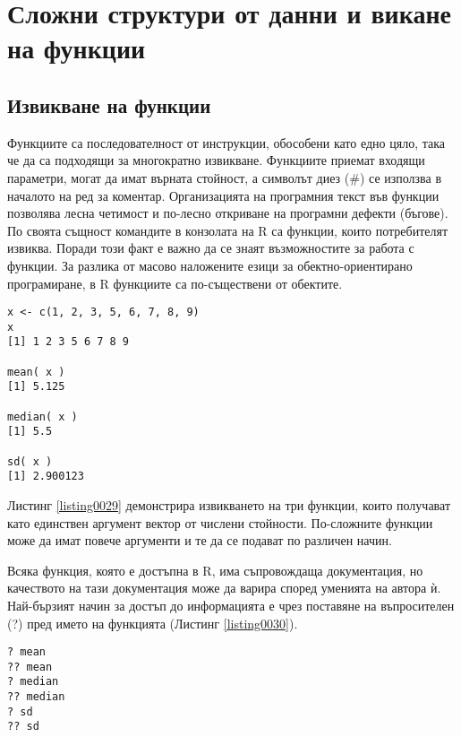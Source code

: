 \newpage
\chapter{Сложни структури от данни и викане на функции}
\label{chapter03}
\thispagestyle{empty}

\section{Извикване на функции}

Функциите са последователност от инструкции, обособени като едно цяло, така че да са подходящи за многократно извикване. Функциите приемат входящи параметри, могат да имат върната стойност, а символът диез (\#) се използва в началото на ред за коментар. Организацията на програмния текст във функции позволява лесна четимост и по-лесно откриване на програмни дефекти (бъгове). По своята същност командите в конзолата на R са функции, които потребителят извиква. Поради този факт е важно да се знаят възможностите за работа с функции. За разлика от масово наложените езици за обектно-ориентирано програмиране, в R функциите са по-съществени от обектите.

\begin{lstlisting}[caption=Извикване на функции, label=listing0029]
x <- c(1, 2, 3, 5, 6, 7, 8, 9)
x
[1] 1 2 3 5 6 7 8 9

mean( x )
[1] 5.125

median( x )
[1] 5.5

sd( x )
[1] 2.900123
\end{lstlisting}

Листинг \ref{listing0029} демонстрира извикването на три функции, които получават като единствен аргумент вектор от числени стойности. По-сложните функции може да имат повече аргументи и те да се подават по различен начин.

Всяка функция, която е достъпна в R, има съпровождаща документация, но качеството на тази документация може да варира според уменията на автора ѝ. Най-бързият начин за достъп до информацията е чрез поставяне на въпросителен (?) пред името на функцията (Листинг \ref{listing0030}).

\begin{lstlisting}[caption=Документация за функциите, label=listing0030]
? mean
?? mean
? median
?? median
? sd
?? sd
\end{lstlisting}

